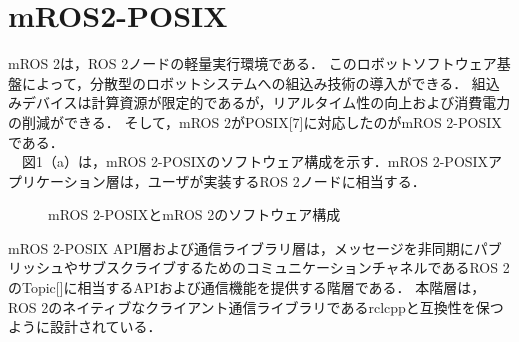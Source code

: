 \documentclass[11pt]{ujarticle}
\begin{document}
\section{mROS2-POSIX}
mROS 2は，ROS 2ノードの軽量実行環境である．
このロボットソフトウェア基盤によって，分散型のロボットシステムへの組込み技術の導入ができる．
組込みデバイスは計算資源が限定的であるが，リアルタイム性の向上および消費電力の削減ができる．
そして，mROS 2がPOSIX[7]に対応したのがmROS 2-POSIXである．
\\　図1（a）は，mROS 2-POSIXのソフトウェア構成を示す．mROS 2-POSIXアプリケーション層は，ユーザが実装するROS 2ノードに相当する．
\begin{figure}[t]
	\centering
	\begin{minipage}{.5\textwidth}
		\centering
		\hfill
	\end{minipage}
	\caption{mROS 2-POSIXとmROS 2のソフトウェア構成}
	
\end{figure}
mROS 2-POSIX API層および通信ライブラリ層は，メッセージを非同期にパブリッシュやサブスクライブするためのコミュニケーションチャネルであるROS 2のTopic[]に相当するAPIおよび通信機能を提供する階層である．
本階層は，ROS 2のネイティブなクライアント通信ライブラリであるrclcppと互換性を保つように設計されている．
\end{document}
